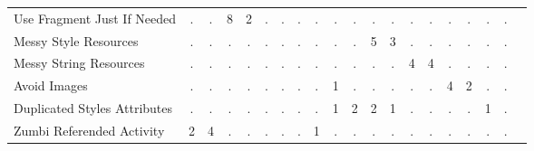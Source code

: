 \begin{table*}[t]
\begin{tabular}{p{4cm}|p{.3cm}p{.3cm}p{.3cm}p{.3cm}p{.3cm}p{.3cm}p{.3cm}p{.3cm}p{.3cm}p{.4cm}p{.4cm}p{.4cm}p{.4cm}p{.4cm}p{.4cm}p{.4cm}p{.4cm}p{.4cm}p{.4cm}}
Use Fragment Just If Needed					& \multicolumn{1}{c}{.}	& \multicolumn{1}{c}{.}	& \multicolumn{1}{c}{8}	& \multicolumn{1}{c}{2}	& \multicolumn{1}{c}{.}	& \multicolumn{1}{c}{.}	& \multicolumn{1}{c}{.}	& \multicolumn{1}{c}{.}	& \multicolumn{1}{c}{.}	& \multicolumn{1}{c}{.}	& \multicolumn{1}{c}{.}	& \multicolumn{1}{c}{.}	& \multicolumn{1}{c}{.}	& \multicolumn{1}{c}{.}	& \multicolumn{1}{c}{.}	& \multicolumn{1}{c}{.}	& \multicolumn{1}{c}{.}	& \multicolumn{1}{c}{.} 		 \\
Messy Style Resources						& \multicolumn{1}{c}{.}	& \multicolumn{1}{c}{.}	& \multicolumn{1}{c}{.}	& \multicolumn{1}{c}{.}	& \multicolumn{1}{c}{.}	& \multicolumn{1}{c}{.}	& \multicolumn{1}{c}{.}	& \multicolumn{1}{c}{.}	& \multicolumn{1}{c}{.}	& \multicolumn{1}{c}{.}	& \multicolumn{1}{c}{5}	& \multicolumn{1}{c}{3}	& \multicolumn{1}{c}{.}	& \multicolumn{1}{c}{.}	& \multicolumn{1}{c}{.}	& \multicolumn{1}{c}{.}	& \multicolumn{1}{c}{.}	& \multicolumn{1}{c}{.} 		 \\
Messy String Resources						& \multicolumn{1}{c}{.}	& \multicolumn{1}{c}{.}	& \multicolumn{1}{c}{.}	& \multicolumn{1}{c}{.}	& \multicolumn{1}{c}{.}	& \multicolumn{1}{c}{.}	& \multicolumn{1}{c}{.}	& \multicolumn{1}{c}{.}	& \multicolumn{1}{c}{.}	& \multicolumn{1}{c}{.}	& \multicolumn{1}{c}{.}	& \multicolumn{1}{c}{.}	& \multicolumn{1}{c}{4}	& \multicolumn{1}{c}{4}	& \multicolumn{1}{c}{.}	& \multicolumn{1}{c}{.}	& \multicolumn{1}{c}{.}	& \multicolumn{1}{c}{.} 		 \\
Avoid Images								& \multicolumn{1}{c}{.}	& \multicolumn{1}{c}{.}	& \multicolumn{1}{c}{.}	& \multicolumn{1}{c}{.}	& \multicolumn{1}{c}{.}	& \multicolumn{1}{c}{.}	& \multicolumn{1}{c}{.}	& \multicolumn{1}{c}{.}	& \multicolumn{1}{c}{1}	& \multicolumn{1}{c}{.}	& \multicolumn{1}{c}{.}	& \multicolumn{1}{c}{.}	& \multicolumn{1}{c}{.}	& \multicolumn{1}{c}{.}	& \multicolumn{1}{c}{4}	& \multicolumn{1}{c}{2}	& \multicolumn{1}{c}{.}	& \multicolumn{1}{c}{.} 		 \\
Duplicated Styles Attributes				& \multicolumn{1}{c}{.}	& \multicolumn{1}{c}{.}	& \multicolumn{1}{c}{.}	& \multicolumn{1}{c}{.}	& \multicolumn{1}{c}{.}	& \multicolumn{1}{c}{.}	& \multicolumn{1}{c}{.}	& \multicolumn{1}{c}{.}	& \multicolumn{1}{c}{1}	& \multicolumn{1}{c}{2}	& \multicolumn{1}{c}{2}	& \multicolumn{1}{c}{1}	& \multicolumn{1}{c}{.}	& \multicolumn{1}{c}{.}	& \multicolumn{1}{c}{.}	& \multicolumn{1}{c}{.}	& \multicolumn{1}{c}{1}	& \multicolumn{1}{c}{.} 		 \\
Zumbi Referended Activity					& \multicolumn{1}{c}{2}	& \multicolumn{1}{c}{4}	& \multicolumn{1}{c}{.}	& \multicolumn{1}{c}{.}	& \multicolumn{1}{c}{.}	& \multicolumn{1}{c}{.}	& \multicolumn{1}{c}{.}	& \multicolumn{1}{c}{1}	& \multicolumn{1}{c}{.}	& \multicolumn{1}{c}{.}	& \multicolumn{1}{c}{.}	& \multicolumn{1}{c}{.}	& \multicolumn{1}{c}{.}	& \multicolumn{1}{c}{.}	& \multicolumn{1}{c}{.}	& \multicolumn{1}{c}{.}	& \multicolumn{1}{c}{.}	& \multicolumn{1}{c}{.} 		 \\

\end{tabular}
\end{table*}
